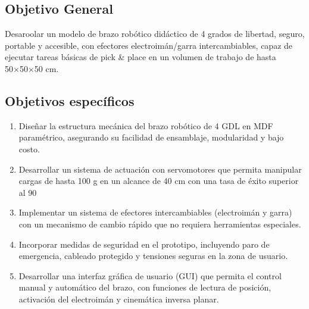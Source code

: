 \subsection{Objetivo General}
Desaroolar un modelo de brazo robótico didáctico de 4 grados de libertad, seguro, portable y accesible, con efectores electroimán/garra intercambiables, capaz de ejecutar tareas básicas de pick \& place en un volumen de trabajo de hasta 50×50×50 cm.

\subsection{Objetivos específicos}
\begin{enumerate}
  \item Diseñar la estructura mecánica del brazo robótico de 4 GDL en MDF paramétrico, asegurando su facilidad de ensamblaje, modularidad y bajo costo.

  \item Desarrollar un sistema de actuación con servomotores que permita manipular cargas de hasta 100 g en un alcance de 40 cm con una tasa de éxito superior al 90%

  \item Implementar un sistema de efectores intercambiables (electroimán y garra) con un mecanismo de cambio rápido que no requiera herramientas especiales.

  \item Incorporar medidas de seguridad en el prototipo, incluyendo paro de emergencia, cableado protegido y tensiones seguras en la zona de usuario.

  \item Desarrollar una interfaz gráfica de usuario (GUI) que permita el control manual y automático del brazo, con funciones de lectura de posición, activación del electroimán y cinemática inversa planar.
\end{enumerate}


